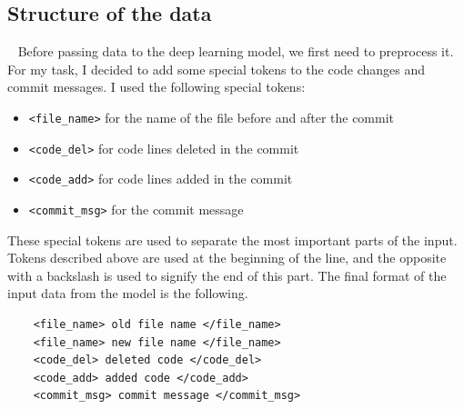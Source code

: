     

 \subsection{Structure of the data}~\label{sec:structure_of_the_data}
 Before passing data to the deep learning model, we first need to preprocess it. For my task, I decided to add some special tokens to the code changes and commit messages. 
 I used the following special tokens:
\begin{itemize}
    \item \verb+<file_name>+ for the name of the file before and after the commit
    \item \verb+<code_del>+ for code lines deleted in the commit
    \item \verb+<code_add>+ for code lines added in the commit
    \item \verb+<commit_msg>+ for the commit message
\end{itemize}
These special tokens are used to separate the most important parts of the input. Tokens described above are used at the beginning of the line, and the opposite with a backslash is used to signify the end of this part. The final format of the input data from the model is the following.
 
 \begin{verbatim}
    <file_name> old file name </file_name>
    <file_name> new file name </file_name>
    <code_del> deleted code </code_del>
    <code_add> added code </code_add>
    <commit_msg> commit message </commit_msg>
\end{verbatim}
